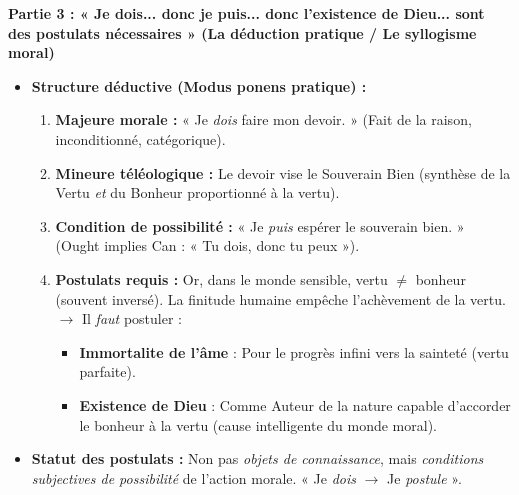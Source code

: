 \documentclass[11pt]{article}
\newcommand{\cle}[1]{{\popxbold\color{popdark}#1}}
\begin{document}
\begin{exoresolu}
\textbf{Partie 3 : « Je dois... donc je puis... donc l'existence de Dieu... sont des postulats nécessaires » (La déduction pratique / Le syllogisme moral)}
\begin{itemize}
    \item \textbf{Structure déductive (Modus ponens pratique) :}
    \begin{enumerate}
        \item \textbf{Majeure morale :} « Je \emph{dois} faire mon devoir. » (Fait de la raison, inconditionné, catégorique).
        \item \textbf{Mineure téléologique :} Le devoir vise le \cle{Souverain Bien} (synthèse de la Vertu \emph{et} du Bonheur proportionné à la vertu).
        \item \textbf{Condition de possibilité :} « Je \emph{puis} espérer le souverain bien. » (Ought implies Can : « Tu dois, donc tu peux »).
        \item \textbf{Postulats requis :} Or, dans le monde sensible, vertu $\neq$ bonheur (souvent inversé). La finitude humaine empêche l'achèvement de la vertu. $\rightarrow$ Il \emph{faut} postuler :
        \begin{itemize}
            \item \textbf{Immortalite de l'âme} : Pour le progrès infini vers la sainteté (vertu parfaite).
            \item \textbf{Existence de Dieu} : Comme \cle{Auteur de la nature} capable d'accorder le bonheur à la vertu (cause intelligente du monde moral).
        \end{itemize}
    \end{enumerate}
    \item \textbf{Statut des postulats :} Non pas \emph{objets de connaissance}, mais \emph{conditions subjectives de possibilité} de l'action morale. « Je \emph{dois} $\rightarrow$ Je \emph{postule} ».
\end{itemize}


\end{exoresolu}
\end{document}
